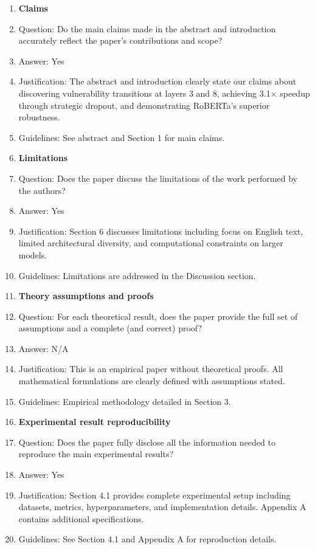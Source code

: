 \documentclass{article}
\begin{document}
\begin{enumerate}

\item {\bf Claims}
    \item[] Question: Do the main claims made in the abstract and introduction accurately reflect the paper's contributions and scope?
    \item[] Answer: Yes
    \item[] Justification: The abstract and introduction clearly state our claims about discovering vulnerability transitions at layers 3 and 8, achieving 3.1× speedup through strategic dropout, and demonstrating RoBERTa's superior robustness.
    \item[] Guidelines: See abstract and Section 1 for main claims.

\item {\bf Limitations}
    \item[] Question: Does the paper discuss the limitations of the work performed by the authors?
    \item[] Answer: Yes
    \item[] Justification: Section 6 discusses limitations including focus on English text, limited architectural diversity, and computational constraints on larger models.
    \item[] Guidelines: Limitations are addressed in the Discussion section.

\item {\bf Theory assumptions and proofs}
    \item[] Question: For each theoretical result, does the paper provide the full set of assumptions and a complete (and correct) proof?
    \item[] Answer: N/A
    \item[] Justification: This is an empirical paper without theoretical proofs. All mathematical formulations are clearly defined with assumptions stated.
    \item[] Guidelines: Empirical methodology detailed in Section 3.

\item {\bf Experimental result reproducibility}
    \item[] Question: Does the paper fully disclose all the information needed to reproduce the main experimental results?
    \item[] Answer: Yes
    \item[] Justification: Section 4.1 provides complete experimental setup including datasets, metrics, hyperparameters, and implementation details. Appendix A contains additional specifications.
    \item[] Guidelines: See Section 4.1 and Appendix A for reproduction details.


\end{enumerate}
\end{document}
